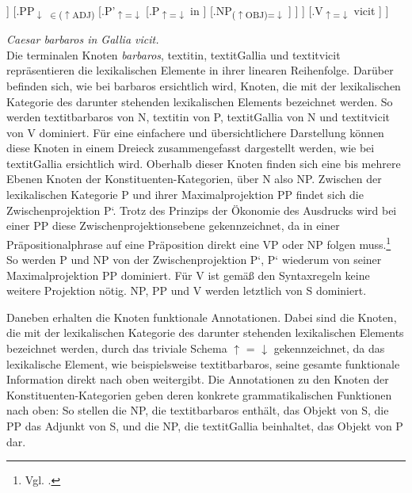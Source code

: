 \documentclass[12pt,a4paper]{article}
\begin{document}
\begin{singlespace}
\Tree [.S 
		[.{NP\textsubscript{($\uparrow$OBJ)=$\downarrow$}}
			[.N\textsubscript{$\uparrow$=$\downarrow$} barbaros ]
		]							
		[.{PP\textsubscript{$\downarrow$ $\in$($\uparrow$ADJ)}}
			[.P'\textsubscript{$\uparrow$=$\downarrow$}						
				[.P\textsubscript{$\uparrow$=$\downarrow$} in ]
				[.{NP\textsubscript{($\uparrow$OBJ)=$\downarrow$}} ]
			]
        ] 	
        [.V\textsubscript{$\uparrow$=$\downarrow$} vicit ]						
	]
\end{singlespace}

\textit{Caesar barbaros in Gallia vicit.} \\

Die terminalen Knoten \textit{barbaros}, textit{in}, textit{Gallia} und textit{vicit} repräsentieren die lexikalischen Elemente in ihrer linearen Reihenfolge. Darüber befinden sich, wie bei barbaros ersichtlich wird, Knoten, die mit der lexikalischen Kategorie des darunter stehenden lexikalischen Elements bezeichnet werden. So werden textit{barbaros} von N, textit{in} von P, textit{Gallia} von N und textit{vicit} von V dominiert. Für eine einfachere und übersichtlichere Darstellung können diese Knoten in einem Dreieck zusammengefasst dargestellt werden, wie bei textit{Gallia} ersichtlich wird. Oberhalb dieser Knoten finden sich eine bis mehrere Ebenen Knoten der Konstituenten-Kategorien, über N also NP. Zwischen der lexikalischen Kategorie P und ihrer Maximalprojektion PP findet sich die Zwischenprojektion P‘. Trotz des Prinzips der Ökonomie des Ausdrucks wird bei einer PP diese Zwischenprojektionsebene gekennzeichnet,  da in einer Präpositionalphrase auf eine Präposition direkt eine VP oder NP folgen muss.\footnote{Vgl. \cite{Snijders}.} So werden P und NP von der Zwischenprojektion P‘, P‘ wiederum von seiner Maximalprojektion PP dominiert. Für V ist gemäß den Syntaxregeln keine weitere Projektion nötig. NP, PP und V werden letztlich von S dominiert.

Daneben erhalten die Knoten funktionale Annotationen. Dabei sind die Knoten, die mit der lexikalischen Kategorie des darunter stehenden lexikalischen Elements bezeichnet werden, durch das triviale Schema $\uparrow$ = $\downarrow$ gekennzeichnet, da das lexikalische Element, wie beispielsweise textit{barbaros}, seine gesamte funktionale Information direkt nach oben weitergibt. Die Annotationen zu den Knoten der Konstituenten-Kategorien geben deren konkrete grammatikalischen Funktionen nach oben: So stellen die NP, die textit{barbaros} enthält, das Objekt von S, die PP das Adjunkt von S, und die NP, die textit{Gallia} beinhaltet, das Objekt von P dar.
\end{document}
